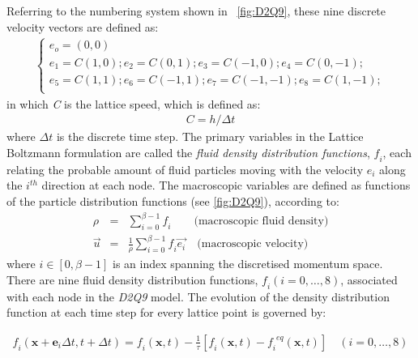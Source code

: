 Referring to the numbering system shown in ~\cref{fig:D2Q9}, these nine discrete velocity vectors are defined as:
\begin{align} 
\begin{cases}
\mathit{e_o}=(0,0)\\
\mathit{e_1}=\mathit{C}(1,0); \mathit{e_2}=\mathit{C}(0,1); \mathit{e_3}=\mathit{C}(-1,0); \mathit{e_4}=\mathit{C}(0,-1); \\
\mathit{e_5}=\mathit{C}(1,1); \mathit{e_6}=\mathit{C}(-1,1); \mathit{e_7}=\mathit{C}(-1,-1); \mathit{e_8}=\mathit{C}(1,-1); \\ 
\end{cases}
\end{align}
in which \textit{C} is the lattice speed, which is defined as:
\begin{align}
\mathit{C}=\mathit{h}/\Delta t
\end{align}
where $\Delta \mathit{t}$ is the discrete time step. The primary variables in the Lattice Boltzmann formulation are called the \textit{fluid density distribution functions}, $\mathit{f_i}$, each relating the probable amount of fluid particles moving with the velocity $\mathit{e_i}$ along the $\mathit{i^{th}}$ direction at each node. The macroscopic variables are defined as functions of the particle distribution functions (see \cref{fig:D2Q9}), according to:
\begin{align} 
 \nonumber
\rho & = & \sum\limits_{\mathit{i}=0}^{\beta - 1}{\mathit{f_i}} \qquad \mbox{(macroscopic fluid density)} \\
\overrightarrow{\mathit{u}} & = & \frac{1}{\rho} \sum\limits_{\mathit{i}=0}^{\beta -1}{\mathit{f_i}\overrightarrow{\mathit{e_i}}} \quad \mbox{(macroscopic velocity)}
\label{eq:lbm_macroscopic}
\end{align} 
where $\mathit{i} \in [0, \beta -1]$ is an index spanning the discretised momentum space. There are nine fluid density distribution functions, $\mathit{f_i}(\mathit{i}=0,\dots,8)$, associated with each node in the \textit{D2Q9} model. The evolution of the density distribution function at each time step for every lattice point is governed by:

\begin{align} 
\label{eq:stream}
\mathit{f_i}(\mathbf{x}+\mathbf{e}_{\mathit{i}} \Delta t, t + \Delta t) = \mathit{f_i}(\mathbf{x},t) - \frac{1}{\tau} [\mathit{f_i}(\mathbf{x},t) -\mathit{f_i}^{\mathit{eq}}(\mathbf{x},t)] \quad (\mathit{i}=0,\dots,8)
\end{align}

